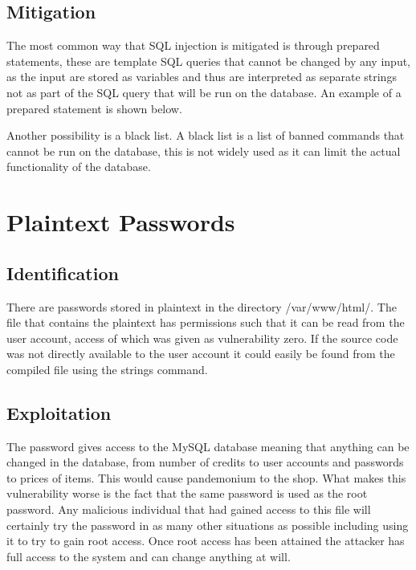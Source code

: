 \documentclass[paper=a4, fontsize=11pt]{scrartcl}
\numberwithin{equation}{section}		%
\numberwithin{figure}{section}			%
\numberwithin{table}{section}				%
\begin{document}
\subsection*{Mitigation}

The most common way that SQL injection is mitigated is through prepared statements, these are template SQL queries that cannot be changed by any input, as the input are stored as variables and thus are interpreted as separate strings not as part of the SQL query that will be run on the database. An example of a prepared statement is shown below.

Another possibility is a black list. A black list is a list of banned commands that cannot be run on the database, this is not widely used as it can limit the actual functionality of the database.

\section*{Plaintext Passwords}
\subsection*{Identification}


There are passwords stored in plaintext in the directory /var/www/html/. The file that contains the plaintext has permissions such that it can be read from the user account, access of which was given as vulnerability zero. If the source code was not directly available to the user account it could easily be found from the compiled file using the strings command. 

\subsection*{Exploitation}


The password gives access to the MySQL database meaning that anything can be changed in the database, from number of credits to user accounts and passwords to prices of items. This would cause pandemonium to the shop. What makes this vulnerability worse is the fact that the same password is used as the root password. Any malicious individual that had gained access to this file will certainly try the password in as many other situations as possible including using it to try to gain root access. Once root access has been attained the attacker has full access to the system and can change anything at will.
\end{document}
